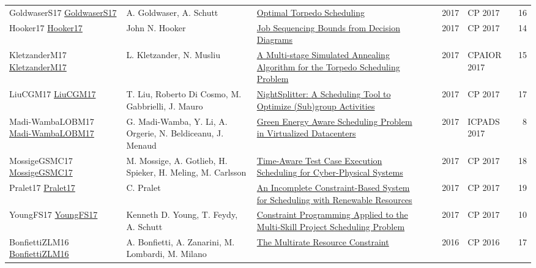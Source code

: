 {\begin{longtable}{p{3cm}p{6cm}p{7cm}rrrp{3cm}r}
GoldwaserS17 \href{https://doi.org/10.1007/978-3-319-66158-2\_22}{GoldwaserS17} & A. Goldwaser, A. Schutt & \href{papers/GoldwaserS17.pdf}{Optimal Torpedo Scheduling} &  & \cite{GoldwaserS17} & 2017 & CP 2017 & 16\\
Hooker17 \href{https://doi.org/10.1007/978-3-319-66158-2\_36}{Hooker17} & John N. Hooker & \href{papers/Hooker17.pdf}{Job Sequencing Bounds from Decision Diagrams} &  & \cite{Hooker17} & 2017 & CP 2017 & 14\\
KletzanderM17 \href{https://doi.org/10.1007/978-3-319-59776-8\_28}{KletzanderM17} & L. Kletzander, N. Musliu & \href{papers/KletzanderM17.pdf}{A Multi-stage Simulated Annealing Algorithm for the Torpedo Scheduling Problem} &  & \cite{KletzanderM17} & 2017 & CPAIOR 2017 & 15\\
LiuCGM17 \href{https://doi.org/10.1007/978-3-319-66158-2\_24}{LiuCGM17} & T. Liu, Roberto Di Cosmo, M. Gabbrielli, J. Mauro & \href{papers/LiuCGM17.pdf}{NightSplitter: {A} Scheduling Tool to Optimize (Sub)group Activities} &  & \cite{LiuCGM17} & 2017 & CP 2017 & 17\\
Madi-WambaLOBM17 \href{https://doi.org/10.1109/ICPADS.2017.00089}{Madi-WambaLOBM17} & G. Madi{-}Wamba, Y. Li, A. Orgerie, N. Beldiceanu, J. Menaud & \href{papers/Madi-WambaLOBM17.pdf}{Green Energy Aware Scheduling Problem in Virtualized Datacenters} &  & \cite{Madi-WambaLOBM17} & 2017 & ICPADS 2017 & 8\\
MossigeGSMC17 \href{https://doi.org/10.1007/978-3-319-66158-2\_25}{MossigeGSMC17} & M. Mossige, A. Gotlieb, H. Spieker, H. Meling, M. Carlsson & \href{papers/MossigeGSMC17.pdf}{Time-Aware Test Case Execution Scheduling for Cyber-Physical Systems} &  & \cite{MossigeGSMC17} & 2017 & CP 2017 & 18\\
Pralet17 \href{https://doi.org/10.1007/978-3-319-66158-2\_16}{Pralet17} & C. Pralet & \href{papers/Pralet17.pdf}{An Incomplete Constraint-Based System for Scheduling with Renewable Resources} &  & \cite{Pralet17} & 2017 & CP 2017 & 19\\
YoungFS17 \href{https://doi.org/10.1007/978-3-319-66158-2\_20}{YoungFS17} & Kenneth D. Young, T. Feydy, A. Schutt & \href{papers/YoungFS17.pdf}{Constraint Programming Applied to the Multi-Skill Project Scheduling Problem} &  & \cite{YoungFS17} & 2017 & CP 2017 & 10\\
BonfiettiZLM16 \href{https://doi.org/10.1007/978-3-319-44953-1\_8}{BonfiettiZLM16} & A. Bonfietti, A. Zanarini, M. Lombardi, M. Milano & \href{papers/BonfiettiZLM16.pdf}{The Multirate Resource Constraint} &  & \cite{BonfiettiZLM16} & 2016 & CP 2016 & 17\\

\end{longtable}}
